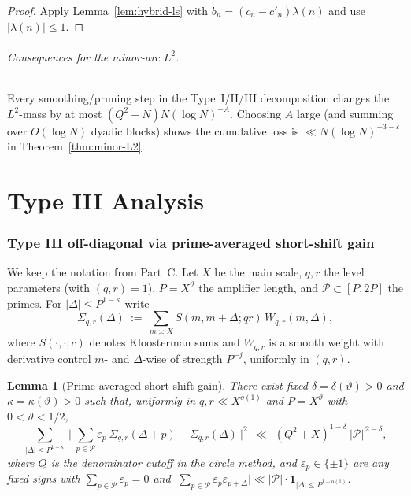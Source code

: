 \documentclass[11pt]{article}
\newtheorem{lemma}{Lemma}[part]
\theoremstyle{definition}
\theoremstyle{remark}
\numberwithin{equation}{part}
\begin{document}
\begin{proof}
	Apply Lemma~\ref{lem:hybrid-ls} with $b_n=(c_n-c'_n)\lambda(n)$ and use $|\lambda(n)|\le1$.
\end{proof}

\paragraph{Consequences for the minor-arc $L^2$.}
Every smoothing/pruning step in the Type~I/II/III decomposition changes the $L^2$-mass by at most $(Q^2+N)N(\log N)^{-A}$. Choosing $A$ large (and summing over $O(\log N)$ dyadic blocks) shows the cumulative loss is $\ll N(\log N)^{-3-\varepsilon}$ in Theorem~\ref{thm:minor-L2}.


\part{Type III Analysis}

\section{Type III off-diagonal via prime-averaged short-shift gain}\label{sec:typeIII-SSG}

We keep the notation from Part~C. Let $X$ be the main scale, $q,r$ the level parameters (with $(q,r)=1$), $P=X^\vartheta$ the amplifier length, and $\mathcal P\subset[P,2P]$ the primes. For $|\Delta|\le P^{1-\kappa}$ write
\[
	\Sigma_{q,r}(\Delta)\ :=\ \sum_{m\asymp X} S(m,m+\Delta;qr)\,W_{q,r}(m,\Delta),
\]
where $S(\cdot,\cdot;c)$ denotes Kloosterman sums and $W_{q,r}$ is a smooth weight with derivative control $m$- and $\Delta$-wise of strength $P^{-j}$, uniformly in $(q,r)$.

\begin{lemma}[Prime-averaged short-shift gain]\label{lem:passg}
	There exist fixed $\delta=\delta(\vartheta)>0$ and $\kappa=\kappa(\vartheta)>0$ such that, uniformly in $q,r\ll X^{o(1)}$ and $P=X^\vartheta$ with $0<\vartheta<1/2$,
	\[
		\sum_{|\Delta|\le P^{1-\kappa}}\ \Big|\ \sum_{p\in\mathcal P}\varepsilon_p\ \Sigma_{q,r}(\Delta+p)-\Sigma_{q,r}(\Delta)\ \Big|^2
		\ \ \ll\ \ (Q^2+X)^{1-\delta}\ |\mathcal P|^{\,2-\delta},
	\]
	where $Q$ is the denominator cutoff in the circle method, and $\varepsilon_p\in\{\pm1\}$ are any fixed signs with $\sum_{p\in\mathcal P}\varepsilon_p=0$ and $\big|\sum_{p\in\mathcal P}\varepsilon_p\varepsilon_{p+\Delta}\big|\ll |\mathcal P|\cdot \mathbf{1}_{|\Delta|\le P^{1-o(1)}}$.
\end{lemma}
\end{document}
